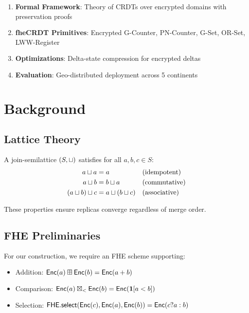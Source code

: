 \documentclass{../shared/luxfhe}
\begin{document}
\begin{enumerate}
    \item \textbf{Formal Framework}: Theory of CRDTs over encrypted domains with preservation proofs
    \item \textbf{fheCRDT Primitives}: Encrypted G-Counter, PN-Counter, G-Set, OR-Set, LWW-Register
    \item \textbf{Optimizations}: Delta-state compression for encrypted deltas
    \item \textbf{Evaluation}: Geo-distributed deployment across 5 continents
\end{enumerate}

\section{Background}

\subsection{Lattice Theory}

\begin{definition}
A join-semilattice $(S, \sqcup)$ satisfies for all $a, b, c \in S$:
\begin{align}
a \sqcup a &= a && \text{(idempotent)} \\
a \sqcup b &= b \sqcup a && \text{(commutative)} \\
(a \sqcup b) \sqcup c &= a \sqcup (b \sqcup c) && \text{(associative)}
\end{align}
\end{definition}

These properties ensure replicas converge regardless of merge order.

\subsection{FHE Preliminaries}

For our construction, we require an FHE scheme supporting:
\begin{itemize}[noitemsep]
    \item Addition: $\mathsf{Enc}(a) \boxplus \mathsf{Enc}(b) = \mathsf{Enc}(a + b)$
    \item Comparison: $\mathsf{Enc}(a) \boxtimes_< \mathsf{Enc}(b) = \mathsf{Enc}(\mathbf{1}[a < b])$
    \item Selection: $\mathsf{FHE.select}(\mathsf{Enc}(c), \mathsf{Enc}(a), \mathsf{Enc}(b)) = \mathsf{Enc}(c ? a : b)$
\end{itemize}
\end{document}
